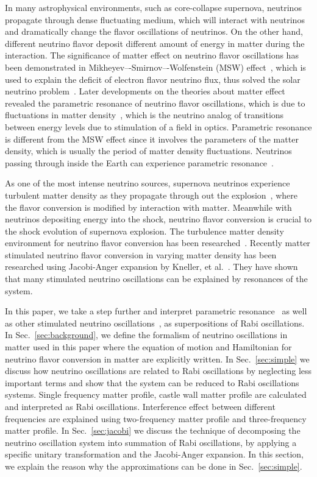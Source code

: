 \documentclass[%
reprint,
 amsmath,amssymb,
 aps,
]{revtex4-1}
\begin{document}
In many astrophysical environments, such as core-collapse supernova,  neutrinos propagate through dense fluctuating medium, which will interact with neutrinos and dramatically change the flavor oscillations of neutrinos. On the other hand, different neutrino flavor deposit different amount of energy in matter during the interaction. The significance of matter effect on neutrino flavor oscillations has been demonstrated in Mikheyev–-Smirnov–-Wolfenstein (MSW) effect~\cite{Mikheev:1986gs,wolf78,wolfensteinprd1979}, which is used to explain the deficit of electron flavor neutrino flux, thus solved the solar neutrino problem~\cite{Petcov2002,kuo1989}. Later developments on the theories about matter effect revealed the parametric resonance of neutrino flavor oscillations, which is due to fluctuations in matter density~\cite{Krastev1989,Akhmedov2000}, which is the neutrino analog of transitions between energy levels due to stimulation of a field in optics. Parametric resonance is different from the MSW effect since it involves the parameters of the matter density, which is usually the period of matter density fluctuations. Neutrinos passing through inside the Earth can experience parametric resonance~\cite{Akhmedov1999, Petcov1998b}. 

As one of the most intense neutrino sources, supernova neutrinos experience turbulent matter density as they propagate through out the explosion~\cite{Muller2015, Couch2015}, where the flavor conversion is modified by interaction with matter. Meanwhile with neutrinos depositing energy into the shock, neutrino flavor conversion is crucial to the shock evolution of supernova explosion. The turbulence matter density environment for neutrino flavor conversion has been researched~\cite{Loreti1994, Friedland2006,Kneller2010}. Recently matter stimulated neutrino flavor conversion in varying matter density has been researched using Jacobi-Anger expansion by Kneller, et al.~\cite{Kneller2013,Patton2014}. They have shown that many stimulated neutrino oscillations can be explained by resonances of the system.

In this paper, we take a step further and interpret parametric resonance~\cite{Akhmedov2000, Krastev1989} as well as other stimulated neutrino oscillations~\cite{Kneller2013, Patton2014}, as superpositions of Rabi oscillations. In Sec.~\ref{sec:background}, we define the formalism of neutrino oscillations in matter used in this paper where the equation of motion and Hamiltonian for neutrino flavor conversion in matter are explicitly written. In Sec.~\ref{sec:simple} we discuss how neutrino oscillations are related to Rabi oscillations by neglecting less important terms and show that the system can be reduced to Rabi oscillations systems. Single frequency matter profile, castle wall matter profile are calculated and interpreted as Rabi oscillations. Interference effect between different frequencies are explained using two-frequency matter profile and three-frequency matter profile. In Sec.~\ref{sec:jacobi} we discuss the technique of decomposing the neutrino oscillation system into summation of Rabi oscillations, by applying a specific unitary transformation and the Jacobi-Anger expansion. In this section, we explain the reason why the approximations can be done in Sec.~\ref{sec:simple}.
\end{document}
